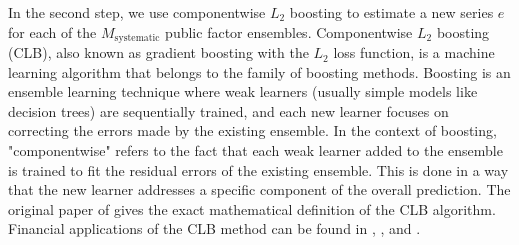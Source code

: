 \documentclass[12pt]{article}
\begin{document}
In the second step, we use componentwise $L_2$ boosting to estimate a new series $e$ for each of the $M_{\mathrm{systematic}}$ public factor ensembles.
Componentwise $L_2$ boosting (CLB), also known as gradient boosting with the $L_2$ loss function, is a machine learning algorithm that belongs to the family of boosting methods. 
Boosting is an ensemble learning technique where weak learners (usually simple models like decision trees) are sequentially trained, and each new learner focuses on correcting the errors made by the existing ensemble.
In the context of boosting, "componentwise" refers to the fact that each weak learner added to the ensemble is trained to fit the residual errors of the existing ensemble. 
This is done in a way that the new learner addresses a specific component of the overall prediction.
The original paper of \citep[Section 2]{B06} gives the exact mathematical definition of the CLB algorithm.
Financial applications of the CLB method can be found in \cite{bai2009boosting}, \cite{mittnik2015stock}, and \cite{tausch2019quadratic}.
\end{document}
